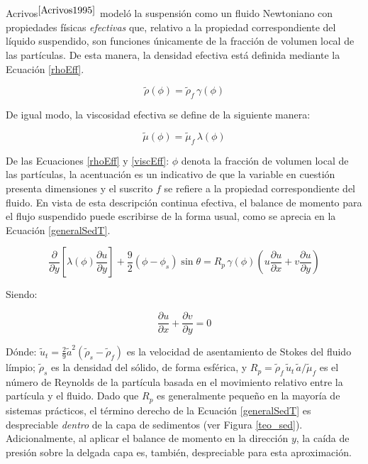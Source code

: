 

\noindent
\justify

Acrivos$^{\cite{Acrivos1995}}$ model\'o la suspensi\'on como un fluido Newtoniano con propiedades f\'isicas \textit{efectivas} que, relativo a la propiedad correspondiente del l\'iquido suspendido, son funciones \'unicamente de la fracci\'on de volumen local de las part\'iculas. De esta manera, la densidad efectiva est\'a definida mediante la Ecuaci\'on \ref{rhoEff}.

\begin{equation}
	\tilde{\rho} (\phi) = \tilde{\rho} _f \, \gamma (\phi)
	\label{rhoEff}
\end{equation}

\noindent
\justify

De igual modo, la viscosidad efectiva se define de la siguiente manera:

\begin{equation}
	\tilde{\mu} (\phi) = \tilde{\mu} _f \, \lambda (\phi)
	\label{viscEff}
\end{equation}

\noindent
\justify

De las Ecuaciones \ref{rhoEff} y \ref{viscEff}: $\phi$ denota la fracci\'on de volumen local de las part\'iculas, la acentuaci\'on es un indicativo de que la variable en cuesti\'on presenta dimensiones y el suscrito $f$ se refiere a la propiedad correspondiente del fluido. En vista de esta descripci\'on continua efectiva, el balance de momento para el flujo suspendido puede escribirse de la forma usual, como se aprecia en la Ecuaci\'on \ref{generalSedT}.

\begin{equation}
	\frac{\partial}{\partial y} \left[ \lambda (\phi) \frac{\partial u}{\partial y} \right] + \frac{9}{2} \left( \phi - \phi _s \right) \sin \theta = R_p \, \gamma (\phi) \left( u \frac{\partial u}{\partial x} + v \frac{\partial u}{\partial y} \right)
	\label{generalSedT}
\end{equation}

\noindent
\justify

Siendo:

\begin{equation}
	\frac{\partial u}{\partial x} + \frac{\partial v}{\partial y} = 0
	\label{vels}
\end{equation}

\noindent
\justify

D\'onde: $\tilde{u} _t = \frac{2}{9} \tilde{a} ^2 \left( \tilde{\rho} _s - \tilde{\rho} _f \right)$ es la velocidad de asentamiento de Stokes del fluido l\'impio; $\tilde{\rho} _s$ es la densidad del s\'olido, de forma esf\'erica, y $R_p = \tilde{\rho} _f \, \tilde{u} _t \, \tilde{a} / \tilde{\mu} _f$ es el n\'umero de Reynolds de la part\'icula basada en el movimiento relativo entre la part\'icula y el fluido. Dado que $R_p$ es generalmente peque\~no en la mayor\'ia de sistemas pr\'acticos, el t\'ermino derecho de la Ecuaci\'on \ref{generalSedT} es despreciable \textit{dentro} de la capa de sedimentos (ver Figura \ref{teo_sed}). Adicionalmente, al aplicar el balance de momento en la direcci\'on $y$, la ca\'ida de presi\'on sobre la delgada capa es, tambi\'en, despreciable para esta aproximaci\'on.

